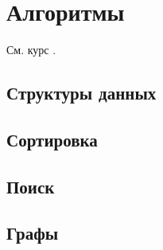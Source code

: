 \chapter{Алгоритмы}

См. курс \cite{c:a-d-a}.
\section{Структуры данных}
\section{Сортировка}
\section{Поиск}
\section{Графы}

